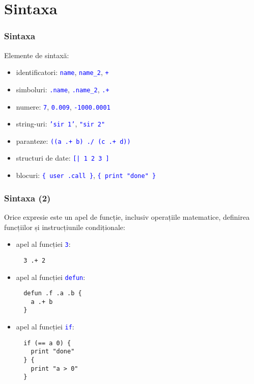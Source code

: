 \documentclass{beamer}
\renewcommand{\c}[1]{\textcolor{blue}{\texttt{#1}}}
\begin{document}
\section{Sintaxa}
\begin{frame}
  \frametitle{Sintaxa}
  Elemente de sintaxă:
  \begin{itemize}
  \item identificatori: \c{name}, \c{name\_2}, \c{+}
  \item simboluri: \c{.name}, \c{.name\_2}, \c{.+}
  \item numere: \c{7}, \c{0.009}, \c{-1000.0001}
  \item string-uri: \c{'sir 1'}, \c{"sir 2"}
  \item paranteze: \c{((a .+ b) ./ (c .+ d))}
  \item structuri de date: \c{[| 1 2 3 ]}
  \item blocuri: \c{\{ user .call \}}, \c{\{ print "done" \}}
  \end{itemize}
\end{frame}

\begin{frame}[containsverbatim]
  \frametitle{Sintaxa (2)}
  Orice expresie este un apel de funcție, inclusiv operațiile matematice, definirea funcțiilor și instrucțiunile condiționale:
  \begin{itemize}
    \item
      apel al funcției \c{3}:
      \color{blue}
      \begin{verbatim}
  3 .+ 2      \end{verbatim}
      \color{black}
    \item
      apel al funcției \c{defun}:
      \color{blue}
      \begin{verbatim}
  defun .f .a .b { 
    a .+ b
  }  \end{verbatim}
      \color{black}
    \item
      apel al funcției \c{if}:
      \color{blue}
      \begin{verbatim}
  if (== a 0) { 
    print "done"
  } {
    print "a > 0"
  }      \end{verbatim}
      \color{black}

  \end{itemize}
\end{frame}
\end{document}
